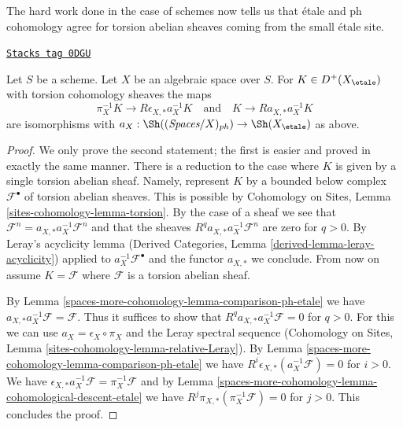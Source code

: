 The hard work done in the case of schemes now tells us that
\'etale and ph cohomology agree for torsion abelian sheaves coming from the
small \'etale site.

\begin{lemma}
\label{spaces-more-cohomology-lemma-cohomological-descent-etale-ph}
\href{https://stacks.math.columbia.edu/tag/0DGU}{\texttt{Stacks tag 0DGU}}

Let $S$ be a scheme. Let $X$ be an algebraic space over $S$.
For $K \in D^+(X_\etale)$ with torsion cohomology sheaves the maps
$$
\pi_X^{-1}K \longrightarrow R\epsilon_{X, *}a_X^{-1}K
\quad\text{and}\quad
K \longrightarrow Ra_{X, *}a_X^{-1}K
$$
are isomorphisms with
$a_X : \Sh((\textit{Spaces}/X)_{ph}) \to \Sh(X_\etale)$ as above.
\end{lemma}

\begin{proof}
We only prove the second statement; the first is easier and proved in exactly
the same manner. There is a reduction to the case where
$K$ is given by a single torsion abelian sheaf. Namely, represent $K$
by a bounded below complex $\mathcal{F}^\bullet$ of torsion
abelian sheaves. This is possible by Cohomology on Sites, Lemma
\ref{sites-cohomology-lemma-torsion}.
By the case of a sheaf we see that
$\mathcal{F}^n = a_{X, *} a_X^{-1} \mathcal{F}^n$
and that the sheaves $R^qa_{X, *}a_X^{-1}\mathcal{F}^n$
are zero for $q > 0$. By Leray's acyclicity lemma
(Derived Categories, Lemma \ref{derived-lemma-leray-acyclicity})
applied to $a_X^{-1}\mathcal{F}^\bullet$
and the functor $a_{X, *}$ we conclude. From now on assume
$K = \mathcal{F}$ where $\mathcal{F}$ is a torsion abelian sheaf.

\medskip\noindent
By Lemma \ref{spaces-more-cohomology-lemma-comparison-ph-etale} we have
$a_{X, *}a_X^{-1}\mathcal{F} = \mathcal{F}$. Thus it suffices to show that
$R^qa_{X, *}a_X^{-1}\mathcal{F} = 0$ for $q > 0$.
For this we can use $a_X = \epsilon_X \circ \pi_X$ and
the Leray spectral sequence
(Cohomology on Sites, Lemma \ref{sites-cohomology-lemma-relative-Leray}).
By Lemma \ref{spaces-more-cohomology-lemma-comparison-ph-etale}
we have $R^i\epsilon_{X, *}(a_X^{-1}\mathcal{F}) = 0$ for $i > 0$.
We have
$\epsilon_{X, *}a_X^{-1}\mathcal{F} = \pi_X^{-1}\mathcal{F}$
and by Lemma \ref{spaces-more-cohomology-lemma-cohomological-descent-etale} we have
$R^j\pi_{X, *}(\pi_X^{-1}\mathcal{F}) = 0$ for $j > 0$.
This concludes the proof.
\end{proof}

